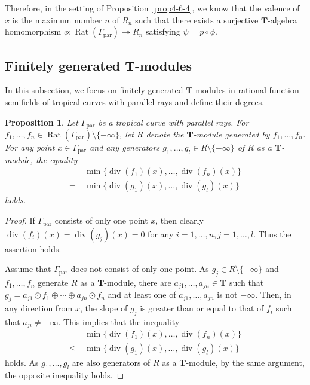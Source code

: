 \documentclass[a4paper,12pt]{amsart}
\newtheorem{prop}[dfn]{Proposition}
\def\Gamma{\varGamma}
\begin{document}
Therefore, in the setting of Proposition~\ref{prop4-6-4}, we know that the valence of $x$ is the maximum number $n$ of $R_n$ such that there exists a surjective $\boldsymbol{T}$-algebra homomorphism $\phi : \operatorname{Rat}(\Gamma_{\operatorname{par}}) \twoheadrightarrow R_n$ satisfying $\psi = p \circ \phi$.

\subsection{Finitely generated \texorpdfstring{$\boldsymbol{T}$}{T}-modules}
    \label{subsection4.7}

In this subsection, we focus on finitely generated $\boldsymbol{T}$-modules in rational function semifields of tropical curves with parallel rays and define their degrees.

\begin{prop}
    \label{prop4-7-1}
Let $\Gamma_{\operatorname{par}}$ be a tropical curve with parallel rays.
For $f_1, \ldots, f_n \in \operatorname{Rat}(\Gamma_{\operatorname{par}}) \setminus \{ -\infty \}$, let $R$ denote the $\boldsymbol{T}$-module generated by $f_1, \ldots, f_n$.
For any point $x \in \Gamma_{\operatorname{par}}$ and any generators $g_1, \ldots, g_l \in R \setminus \{ -\infty \}$ of $R$ as a $\boldsymbol{T}$-module, the equality
\begin{align*}
&~ \operatorname{min}\{ \operatorname{div}(f_1)(x), \ldots, \operatorname{div}(f_n)(x)\}\\
=&~ \operatorname{min}\{ \operatorname{div}(g_1)(x), \ldots, \operatorname{div}(g_l)(x)\}
\end{align*}
holds.
\end{prop}

\begin{proof}
If $\Gamma_{\operatorname{par}}$ consists of only one point $x$, then clearly $\operatorname{div}(f_i)(x) = \operatorname{div}(g_j)(x) = 0$ for any $i = 1, \ldots, n, j = 1, \ldots, l$.
Thus the assertion holds.

Assume that $\Gamma_{\operatorname{par}}$ does not consist of only one point.
As $g_j \in R \setminus \{ -\infty \}$ and $f_1, \ldots, f_n$ generate $R$ as a $\boldsymbol{T}$-module, there are $a_{j1}, \ldots, a_{jn} \in \boldsymbol{T}$ such that $g_j = a_{j1} \odot f_1 \oplus \cdots \oplus a_{jn} \odot f_n$ and at least one of $a_{j1}, \ldots, a_{jn}$ is not $-\infty$.
Then, in any direction from $x$, the slope of $g_j$ is greater than or equal to that of $f_i$ such that $a_{ji} \not= -\infty$.
This implies that the inequality
\begin{align*}
&~ \operatorname{min}\{ \operatorname{div}(f_1)(x), \ldots, \operatorname{div}(f_n)(x)\}\\
\le&~ \operatorname{min}\{ \operatorname{div}(g_1)(x), \ldots, \operatorname{div}(g_l)(x)\} 
\end{align*}
holds.
As $g_1, \ldots, g_l$ are also generators of $R$ as a $\boldsymbol{T}$-module, by the same argument, the opposite inequality holds.
\end{proof}
\end{document}
